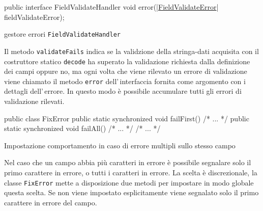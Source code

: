 \documentclass[a4paper,10pt]{report}
\newif\ifesource
\newenvironment{elisting}[1][H]
  {\captionsetup{aboveskip=0pt}\begin{listing}[#1]}
  {\end{listing}%
}
\begin{document}
\ifesource
\begin{figure*}[!htb]
\begin{lstlisting}[language=java, 
caption={gestore errori \texttt{FieldValidateHandler}}, 
label=lst:FieldValidateHandler:java]
public interface FieldValidateHandler {
    void error((|hyperref[lst:FieldValidateError:java]{FieldValidateError}| fieldValidateError);
}
\end{lstlisting}
\end{figure*}
\else
\begin{elisting}[!htb]
\begin{javacode}
public interface FieldValidateHandler {
    void error(|\hyperref[lst:FieldValidateError:java]{FieldValidateError}| fieldValidateError);
}
\end{javacode}
\caption{gestore errori \texttt{FieldValidateHandler}}
\label{lst:FieldValidateHandler:java}
\end{elisting}
\fi

Il metodo \texttt{validateFails} indica se la validzione della stringa-dati
acquisita con il costruttore statico \texttt{decode} ha superato la validazione
richiesta dalla definizione dei campi oppure no, ma ogni volta che viene 
rilevato un errore di validazione viene chiamato il metodo \texttt{error}
dell'\,interfaccia fornita come argomento con i dettagli dell'\,errore.
In questo modo è possibile accumulare tutti gli errori di validazione rilevati.


\begin{elisting}[!htb]
\begin{javacode}
public class FixError {
    public static synchronized void failFirst() { /* ... */ }
    public static synchronized void failAll() { /* ... */ }
    /* ... */
}
\end{javacode}
\caption{Impostazione comportamento in caso di errore multipli sullo stesso campo}
\label{lst:failFirst.failAll}
\end{elisting}

Nel caso che un campo abbia più caratteri in errore è possibile segnalare solo
il primo carattere in errore, o tutti i caratteri in errore.
La scelta è discrezionale, la classe \texttt{FixError} mette a disposizione due 
metodi per impostare in modo globale questa scelta. Se non viene impostato
esplicitamente viene segnalato solo il primo carattere in errore del campo.
\end{document}
